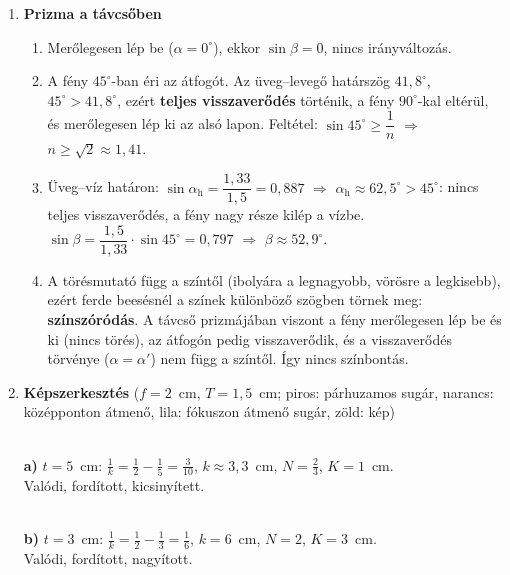 \documentclass[11pt,a4paper]{article}
\newcommand{\lenskep}[5]{%
  \pgfmathsetmacro{\kk}{1/(1/#1 - 1/#2)}%
  \pgfmathsetmacro{\KK}{-#3*\kk/#2}%
  \pgfmathsetmacro{\HH}{max(#3,abs(\KK))+0.45}%
  \pgfmathtruncatemacro{\virt}{\kk<0 ? 1 : 0}%
  \pgfmathtruncatemacro{\gyujto}{#1>0 ? 1 : 0}%
  \draw[gray!25,very thin] (#4,-3.5) grid (#5,3.5);
  \draw[->,gray] (#4,0) -- (#5,0);
  \ifnum\gyujto=1
    \draw[{Stealth[length=2mm]}-{Stealth[length=2mm]},thick,blue!60!black] (0,-3.5) -- (0,3.5);
  \else
    \draw[{Stealth[length=2mm,reversed]}-{Stealth[length=2mm,reversed]},thick,blue!60!black] (0,-3.5) -- (0,3.5);
  \fi
  \fill (#1,0) circle (1.5pt) node[below,font=\scriptsize] {$F$};
  \fill (-#1,0) circle (1.5pt) node[below,font=\scriptsize] {$F$};
  \draw[very thick,-{Stealth[length=2mm]}] (-#2,0) -- (-#2,#3);
  \begin{scope}
    \clip (#4,-3.5) rectangle (#5,3.5);
    \ifnum\gyujto=1
      \draw[red!75!black] (-#2,#3) -- (0,#3) -- ($(0,#3)!8!(#1,0)$);
    \else
      \draw[red!75!black] (-#2,#3) -- (0,#3) -- ($(0,#3)!-8!(#1,0)$);
    \fi
    \draw[orange!85!black] (-#2,#3) -- ($(-#2,#3)!8!(0,0)$);
    \ifnum\virt=1
      \draw[red!75!black,dashed] (0,#3) -- (\kk,\KK);
      \draw[orange!85!black,dashed] (0,0) -- (\kk,\KK);
      \ifnum\gyujto=0 \draw[red!75!black,dashed] (\kk,\KK) -- (#1,0); \fi
      \draw[very thick,dashed,green!50!black,-{Stealth[length=2mm]}] (\kk,0) -- (\kk,\KK);
    \else
      \draw[violet] (-#2,#3) -- (0,\KK) -- (#5,\KK);
      \draw[very thick,green!50!black,-{Stealth[length=2mm]}] (\kk,0) -- (\kk,\KK);
    \fi
  \end{scope}
}
\begin{document}
\begin{enumerate}
\item \textbf{Prizma a távcsőben}
  \begin{enumerate}
    \item Merőlegesen lép be ($\alpha = 0^\circ$), ekkor $\sin\beta = 0$, nincs irányváltozás.
    \item A fény $45^\circ$-ban éri az átfogót. Az üveg--levegő határszög $41{,}8^\circ$,
      $45^\circ > 41{,}8^\circ$, ezért \textbf{teljes visszaverődés} történik, a fény
      $90^\circ$-kal eltérül, és merőlegesen lép ki az alsó lapon. Feltétel:
      $\sin 45^\circ \ge \dfrac1n$ $\Rightarrow$ $n \ge \sqrt2 \approx 1{,}41$.
    \item Üveg--víz határon: $\sin\alpha_\text{h} = \dfrac{1{,}33}{1{,}5} = 0{,}887$
      $\Rightarrow$ $\alpha_\text{h} \approx 62{,}5^\circ > 45^\circ$: nincs teljes
      visszaverődés, a fény nagy része kilép a vízbe.
      $\sin\beta = \dfrac{1{,}5}{1{,}33}\cdot\sin 45^\circ = 0{,}797$ $\Rightarrow$
      $\beta \approx 52{,}9^\circ$.
    \item A törésmutató függ a színtől (ibolyára a legnagyobb, vörösre a legkisebb), ezért
      ferde beesésnél a színek különböző szögben törnek meg: \textbf{színszóródás}. A
      távcső prizmájában viszont a fény merőlegesen lép be és ki (nincs törés), az átfogón
      pedig visszaverődik, és a visszaverődés törvénye ($\alpha = \alpha'$) nem függ a
      színtől. Így nincs színbontás.
  \end{enumerate}

\newpage
\item \textbf{Képszerkesztés} ($f = 2$~cm, $T = 1{,}5$~cm; piros: párhuzamos sugár,
  narancs: középponton átmenő, lila: fókuszon átmenő sugár, zöld: kép)

  \begin{minipage}[t]{0.49\linewidth}\centering
  \\[2pt]
  \small\textbf{a)} $t = 5$~cm: $\tfrac1k = \tfrac12 - \tfrac15 = \tfrac3{10}$,
  $k \approx 3{,}3$~cm, $N = \tfrac23$, $K = 1$~cm.\\
  Valódi, fordított, kicsinyített.
  \end{minipage}\hfill
  \begin{minipage}[t]{0.49\linewidth}\centering
  \\[2pt]
  \small\textbf{b)} $t = 3$~cm: $\tfrac1k = \tfrac12 - \tfrac13 = \tfrac16$,
  $k = 6$~cm, $N = 2$, $K = 3$~cm.\\
  Valódi, fordított, nagyított.
  \end{minipage}


\end{enumerate}
\end{document}
